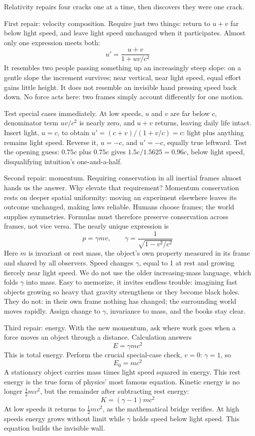 \begin{mainline}
Relativity repairs four cracks one at a time, then discovers they were one crack.

First repair: velocity composition. Require just two things: return to \(u+v\) far below light speed, and leave light speed unchanged when it participates. Almost only one expression meets both:
\[
u'=\frac{u+v}{1+uv/c^{2}}
\]
It resembles two people passing something up an increasingly steep slope: on a gentle slope the increment survives; near vertical, near light speed, equal effort gains little height. It does not resemble an invisible hand pressing speed back down. No force acts here: two frames simply account differently for one motion.

Test special cases immediately. At low speeds, \(u\) and \(v\) are far below \(c\), denominator term \(uv/c^{2}\) is nearly zero, and \(u+v\) returns, leaving daily life intact. Insert light, \(u=c\), to obtain \(u'=(c+v)/(1+v/c)=c\): light plus anything remains light speed. Reverse it, \(u=-c\), and \(u'=-c\), equally true leftward. Test the opening guess: \(0.75c\) plus \(0.75c\) gives \(1.5c/1.5625=0.96c\), below light speed, disqualifying intuition's one-and-a-half.

Second repair: momentum. Requiring conservation in all inertial frames almost hands us the answer. Why elevate that requirement? Momentum conservation rests on deeper spatial uniformity: moving an experiment elsewhere leaves its outcome unchanged, making laws reliable. Humans choose frames; the world supplies symmetries. Formulas must therefore preserve conservation across frames, not vice versa. The nearly unique expression is
\[
p=\gamma mv,\qquad \gamma=\frac{1}{\sqrt{1-v^{2}/c^{2}}}
\]
Here \(m\) is invariant or rest mass, the object's own property measured in its frame and shared by all observers. Speed changes \(\gamma\), equal to 1 at rest and growing fiercely near light speed. We do not use the older increasing-mass language, which folds \(\gamma\) into mass. Easy to memorize, it invites endless trouble: imagining fast objects growing so heavy that gravity strengthens or they become black holes. They do not: in their own frame nothing has changed; the surrounding world moves rapidly. Assign change to \(\gamma\), invariance to mass, and the books stay clear.

Third repair: energy. With the new momentum, ask where work goes when a force moves an object through a distance. Calculation answers
\[
E=\gamma mc^{2}
\]
This is total energy. Perform the crucial special-case check, \(v=0\): \(\gamma=1\), so
\[
E_{0}=mc^{2}
\]
A stationary object carries mass times light speed squared in energy. This rest energy is the true form of physics' most famous equation. Kinetic energy is no longer \(\tfrac12 mv^{2}\), but the remainder after subtracting rest energy:
\[
K=(\gamma-1)mc^{2}
\]
At low speeds it returns to \(\tfrac12 mv^{2}\), as the mathematical bridge verifies. At high speeds energy grows without limit while \(\gamma\) holds speed below light speed. This equation builds the invisible wall.


\end{mainline}
